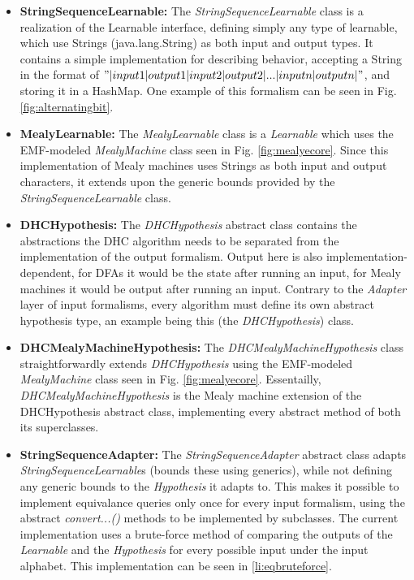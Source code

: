 \begin{itemize}
	\item \textbf{StringSequenceLearnable:} The \emph{StringSequenceLearnable} class is a realization of the Learnable interface, defining simply any type of learnable, which use Strings (java.lang.String) as both input and output types. It contains a simple implementation for describing behavior, accepting a String in the format of $"|input1|output1|input2|output2|...|inputn|outputn|"$, and storing it in a HashMap. One example of this formalism can be seen in Fig. \ref{fig:alternatingbit}.
	
	\item \textbf{MealyLearnable:} The \emph{MealyLearnable} class is a \emph{Learnable} which uses the EMF-modeled \emph{MealyMachine} class seen in Fig. \ref{fig:mealyecore}. Since this implementation of Mealy machines uses Strings as both input and output characters, it extends upon the generic bounds provided by the \emph{StringSequenceLearnable} class.
	
	\item \textbf{DHCHypothesis:} The \emph{DHCHypothesis} abstract class contains the abstractions the DHC algorithm needs to be separated from the implementation of the output formalism. Output here is also implementation-dependent, for DFAs it would be the state after running an input, for Mealy machines it would be output after running an input. Contrary to the \emph{Adapter} layer of input formalisms, every algorithm must define its own abstract hypothesis type, an example being this (the \emph{DHCHypothesis}) class.
	
	\item \textbf{DHCMealyMachineHypothesis:} The \emph{DHCMealyMachineHypothesis} class straightforwardly extends \emph{DHCHypothesis} using the EMF-modeled \emph{MealyMachine} class seen in Fig. \ref{fig:mealyecore}. Essentailly, \emph{DHCMealyMachineHypothesis} is the Mealy machine extension of the DHCHypothesis abstract class, implementing every abstract method of both its superclasses.
	
	\item \textbf{StringSequenceAdapter:} The \emph{StringSequenceAdapter} abstract class adapts \emph{StringSequenceLearnable}s (bounds these using generics), while not defining any generic bounds to the \emph{Hypothesis} it adapts to. This makes it possible to implement equivalance queries only once for every input formalism, using the abstract \emph{convert...()} methods to be implemented by subclasses. The current implementation uses a brute-force method of comparing the outputs of the \emph{Learnable} and the \emph{Hypothesis} for every possible input under the input alphabet. This implementation can be seen in \ref{li:eqbruteforce}.
	

\end{itemize}
